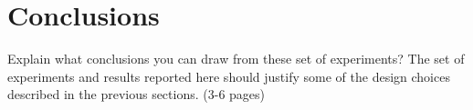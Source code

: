 
\section{Conclusions}
Explain what conclusions you can draw from these set of experiments? The set of experiments and results reported here should justify some of the design choices
described in the previous sections. (3-6 pages)